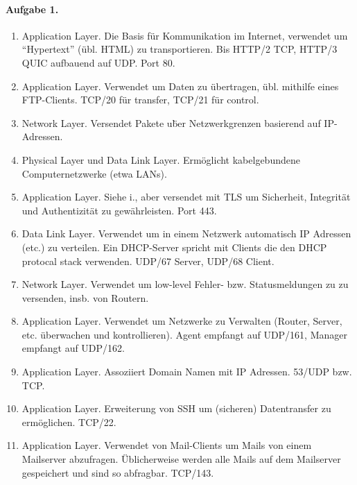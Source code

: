 \documentclass{article}
\begin{document}
\paragraph{Aufgabe 1.}

\begin{enumerate}[label=\roman*.]
    \item Application Layer. Die Basis f\"ur Kommunikation im Internet, verwendet um \enquote{Hypertext} (\"ubl. HTML) zu transportieren. Bis HTTP/2 TCP, HTTP/3 QUIC aufbauend auf UDP. Port 80. 
    
    \item Application Layer. Verwendet um Daten zu \"ubertragen, \"ubl. mithilfe eines FTP-Clients. TCP/20 f\"ur transfer, TCP/21 f\"ur control.
    
    \item Network Layer. Versendet Pakete u\"ber Netzwerkgrenzen basierend auf IP-Adressen.
    
    \item Physical Layer und Data Link Layer. Erm\"oglicht kabelgebundene Computernetzwerke (etwa LANs).
    
    \item Application Layer. Siehe i., aber versendet mit TLS um Sicherheit, Integrit\"at und Authentizität zu gew\"ahrleisten. Port 443.
    
    \item Data Link Layer. Verwendet um in einem Netzwerk automatisch IP Adressen (etc.) zu verteilen. Ein DHCP-Server spricht mit Clients die den DHCP protocal stack verwenden. UDP/67 Server, UDP/68 Client.
    
    \item Network Layer. Verwendet um low-level Fehler- bzw. Statusmeldungen zu zu versenden, insb. von Routern.
    
    \item Application Layer. Verwendet um Netzwerke zu Verwalten (Router, Server, etc. \"uberwachen und kontrollieren). Agent empfangt auf UDP/161, Manager empfangt auf UDP/162.
    
    \item Application Layer. Assoziiert Domain Namen mit IP Adressen. 53/UDP bzw. TCP.
    
    \item Application Layer. Erweiterung von SSH um (sicheren) Datentransfer zu erm\"oglichen. TCP/22.
    
    \item Application Layer. Verwendet von Mail-Clients um Mails von einem Mailserver abzufragen. \"Ublicherweise werden alle Mails auf dem Mailserver gespeichert und sind so abfragbar. TCP/143.
    

\end{enumerate}
\end{document}
